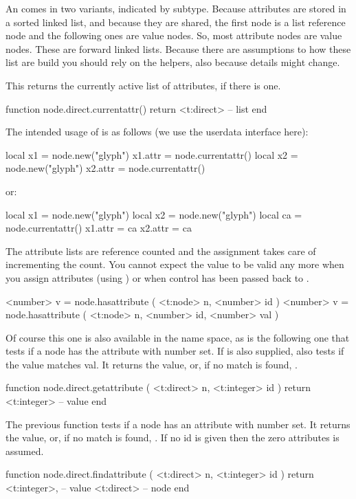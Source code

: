 An  comes in two variants, indicated by subtype. Because
attributes are stored in a sorted linked list, and because they are shared, the
first node is a list reference node and the following ones are value nodes. So,
most attribute nodes are value nodes. These are forward linked lists. Because
there are assumptions to how these list are build you should rely on the helpers,
also because details might change.

This returns the currently active list of attributes, if there is one.

\starttyping[option=LUA]
function node.direct.currentattr()
    return <t:direct> -- list
end
\stoptyping

The intended usage of  is as follows (we use the userdata
interface here):

\starttyping[option=LUA]
local x1 = node.new("glyph")
x1.attr = node.currentattr()
local x2 = node.new("glyph")
x2.attr = node.currentattr()
\stoptyping

or:

\starttyping[option=LUA]
local x1 = node.new("glyph")
local x2 = node.new("glyph")
local ca = node.currentattr()
x1.attr = ca
x2.attr = ca
\stoptyping

The attribute lists are reference counted and the assignment takes care of
incrementing the count. You cannot expect the value  to be valid any
more when you assign attributes (using ) or when control
has been passed back to \TEX.

\starttyping[option=LUA]
<number> v = node.hasattribute ( <t:node> n, <number> id )
<number> v = node.hasattribute ( <t:node> n, <number> id, <number> val )
\stoptyping

Of course this one is also available in the  name space, as is
the following one that tests if a node has the attribute with number 
set. If  is also supplied, also tests if the value matches \type
{val}. It returns the value, or, if no match is found, .

\starttyping[option=LUA]
function node.direct.getattribute ( <t:direct> n, <t:integer> id )
    return <t:integer> -- value
end
\stoptyping

The previous function tests if a node has an attribute with number 
set. It returns the value, or, if no match is found, . If no \type
{id} is given then the zero attributes is assumed.

\starttyping[option=LUA]
function node.direct.findattribute ( <t:direct> n, <t:integer> id )
    return
        <t:integer>, -- value
        <t:direct>   -- node
end
\stoptyping

